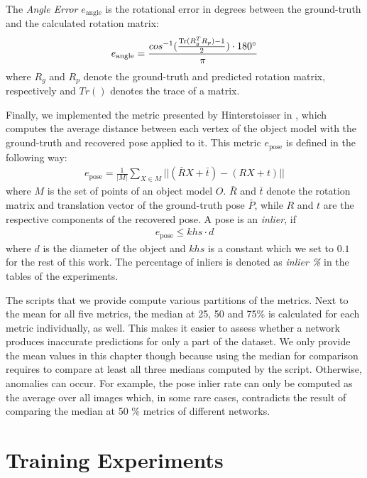 The \textit{Angle Error} $e_{\text{angle}}$ is the rotational error in degrees between the ground-truth and the calculated rotation matrix:
\begin{align*}
e_{\text{angle}} = \frac{cos^{-1}(\frac{\operatorname{Tr}(R_g^TR_p) - 1}{2}) \cdot 180\degree}{\pi}
\end{align*}
where $R_g$ and $R_p$ denote the ground-truth and predicted rotation matrix, respectively and $Tr()$ denotes the trace of a matrix.

Finally, we implemented the metric presented by Hinterstoisser \etal in \cite{hinterstoisser2}, which computes the average distance between each vertex of the object model with the ground-truth and recovered pose applied to it. This metric $e_{\text{pose}}$ is defined in the following way:
\begin{align*}
e_{\text{pose}} = \frac{1}{|M|} \sum\limits_{X \in M}||(\bar{R}X + \bar{t}) - (RX + t)||
\end{align*}
where $M$ is the set of points of an object model $O$. $\bar{R}$ and $\bar{t}$ denote the rotation matrix and translation vector of the ground-truth pose $\bar{P}$, while $R$ and $t$ are the respective components of the recovered pose. A pose is an \textit{inlier}, if
\begin{align*}
e_{\text{pose}} \leq khs \cdot d
\end{align*}
where $d$ is the diameter of the object and $khs$ is a constant which we set to $0.1$ for the rest of this work. The percentage of inliers is denoted as \textit{inlier \%} in the tables of the experiments.

The scripts that we provide compute various partitions of the metrics. Next to the mean for all five metrics, the median at 25, 50 and 75\% is calculated for each metric individually, as well. This makes it easier to assess whether a network produces inaccurate predictions for only a part of the dataset. We only provide the mean values in this chapter though because using the median for comparison requires to compare at least all three medians computed by the script. Otherwise, anomalies can occur. For example, the pose inlier rate can only be computed as the average over all images which, in some rare cases, contradicts the result of comparing the median at 50 \% metrics of different networks.

\section{Training Experiments}

